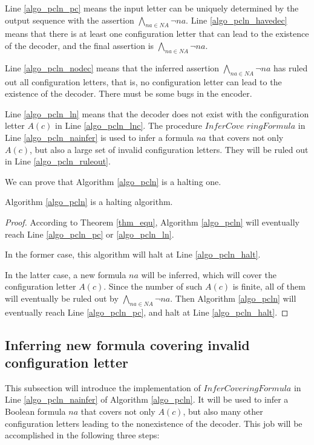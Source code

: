 \documentclass[journal]{IEEEtran}
\begin{document}
Line \ref{algo_pcln_pc} means the input letter can be uniquely determined by the output sequence with the assertion $\bigwedge_{na\in NA}\neg na$.
Line \ref{algo_pcln_havedec} means that there is at least one configuration letter that can lead to the existence of the decoder,
and the final assertion is $\bigwedge_{na\in NA}\neg na$.

Line \ref{algo_pcln_nodec} means that the inferred assertion $\bigwedge_{na\in NA}\neg na$ has ruled out all configuration letters,
that is,
no configuration letter can lead to the existence of the decoder.
There must be some bugs in the encoder.

Line \ref{algo_pcln_ln} means that the decoder does not exist with the configuration letter $A(c)$ in Line \ref{algo_pcln_lnc}.
The procedure $InferCove$ $ringFormula$ in Line \ref{algo_pcln_nainfer} is used to infer a formula $na$ that covers not only $A(c)$,
but also a large set of invalid configuration letters.
They will be ruled out in Line \ref{algo_pcln_ruleout}.

We can prove that Algorithm \ref{algo_pcln} is a halting one.
\begin{theorem}[]\label{thm_pcln_halt}
Algorithm \ref{algo_pcln} is a halting algorithm.
\end{theorem}
\begin{proof}
According to Theorem \ref{thm_equ},
Algorithm \ref{algo_pcln} will eventually reach Line \ref{algo_pcln_pc} or \ref{algo_pcln_ln}.

In the former case,
this algorithm will halt at Line \ref{algo_pcln_halt}.

In the latter case,
a new formula $na$ will be inferred,
which will cover the configuration letter $A(c)$.
Since the number of such $A(c)$ is finite,
all of them will eventually be ruled out by $\bigwedge_{na\in NA}\neg na$.
Then Algorithm \ref{algo_pcln} will eventually reach Line \ref{algo_pcln_pc},
and halt at Line \ref{algo_pcln_halt}.
\end{proof}

\subsection{Inferring new formula covering invalid configuration letter}\label{subsec_infer}
This subsection will introduce the implementation of $InferCoveringFormula$ in Line \ref{algo_pcln_nainfer} of Algorithm \ref{algo_pcln}.
It will be used to infer a Boolean formula $na$
that covers not only $A(c)$,
but also many other configuration letters leading to the nonexistence of the decoder.
This job will be accomplished in the following three steps:
\end{document}
